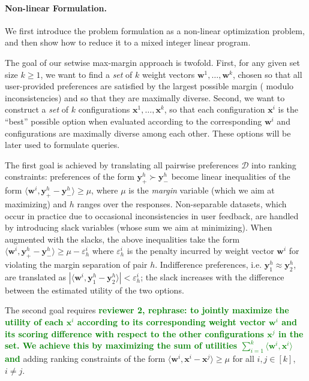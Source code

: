 \documentclass{article}
\renewcommand\[{\begin{equation}}
\renewcommand\]{\end{equation}}
\newcommand{\calvar}[1]{\ensuremath{\mathcal{#1}}}
\newcommand{\calD}{\calvar{D}}
\newcommand{\vecvar}[1]{\ensuremath{\boldsymbol{#1}}}
\newcommand{\vw}{\vecvar{w}}
\newcommand{\vx}{\vecvar{x}}
\newcommand{\vy}{\vecvar{y}}
\newcommand{\stefano}[1]{{\bf \textcolor{green}{{\fbox{Stefano:} #1}}}}
\begin{document}
\paragraph{Non-linear Formulation.} We first introduce the problem
formulation as a %
non-linear optimization problem, and
then show how to reduce it to a mixed integer linear program.%

The goal of our setwise max-margin approach is twofold. First, for any
given set size $k\geq 1$, we want to find a {\em set} of $k$ weight
vectors $\vw^{1}, \ldots, \vw^{k}$, chosen so that all user-provided
preferences are satisfied by the largest possible margin (%
modulo inconsistencies) and so that they are maximally
diverse.  Second, we want to construct a {\em set} of $k$
configurations $\vx^{1}, \ldots, \vx^{k}$, so that each configuration
$\vx^{i}$ is the ``best'' possible option when evaluated according to
the corresponding $\vw^{i}$ and configurations are maximally diverse
among each other. These options will be later used to formulate
queries.

The first goal is achieved by translating all pairwise preferences
$\calD$ into ranking constraints: preferences of the form
$\vy^h_+ \succ \vy^h_-$ become linear inequalities of the form
$\langle \vw^i, \vy^h_+ - \vy^h_- \rangle \geq \mu$, where $\mu$ is the
{\em margin} variable (which we aim at maximizing) and $h$ ranges over
the responses.  Non-separable datasets, which occur in practice due to
occasional inconsistencies in user feedback, are handled by
introducing slack variables (whose sum we aim at minimizing). When
augmented with the slacks, the above inequalities take the form
$\langle \vw^{i}, \vy^{h}_+ - \vy^{h}_- \rangle \ge \mu - \varepsilon^{i}_h$
where $\varepsilon^{i}_h$ is the penalty incurred by weight vector $\vw^{i}$
for violating the margin separation of pair $h$. Indifference preferences, i.e.
$\vy^h_1 \approx \vy^h_2$, are translated as $|\langle \vw^i, \vy^h_1 - \vy^h_2 \rangle| < \varepsilon^i_h$;
the slack increases with the difference between the estimated utility of the
two options.

The second goal requires \stefano{reviewer 2, rephrase: to jointly maximize the utility of each
$\vx^{i}$ according to its corresponding weight vector $\vw^i$ and its
scoring difference with respect to the other configurations $\vx^j$ in
the set. We achieve this by maximizing the sum of utilities
$\sum_{i=1}^k \langle \vw^{i}, \vx^{i} \rangle$ and} adding ranking
constraints of the form
$\langle \vw^{i}, \vx^{i} - \vx^{j} \rangle \geq \mu$ for all
$i,j\in[k]$, $i \ne j$.
\end{document}
